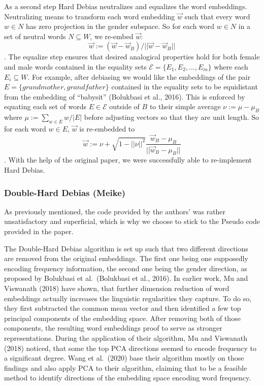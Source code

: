 \documentclass[
  english,
  man,floatsintext]{apa6}
\begin{document}
As a second step Hard Debias neutralizes and equalizes the word embeddings. Neutralizing means to transform each word embedding \(\vec{w}\) such that every word \(w\in N\) has zero projection in the gender subspace. So for each word \(w\in N\) in a set of neutral words \(N \subseteq W\), we re-embed \(\vec{w}\): \[\vec{w}:=(\vec{w}-\vec{w}_B)/||\vec{w}-\vec{w}_B||\]. The equalize step ensures that desired analogical properties hold for both female and male words contained in the equality sets \(\mathcal{E}=\{E_1,E_2,...,E_m\}\) where each \(E_i \subseteq W\). For example, after debiasing we would like the embeddings of the pair \(E=\{grandmother, grandfather\}\) contained in the equality sets to be equidistant from the embedding of \enquote{babysit} (Bolukbasi et al., 2016). This is enforced by equating each set of words \(E\in \mathcal{E}\) outside of \(B\) to their simple average \(\nu:=\mu-\mu_B\) where \(\mu:=\sum_{w\in E}w/|E|\) before adjusting vectors so that they are unit length. So for each word \(w\in E\), \(\vec{w}\) is re-embedded to \[\vec{w}:=\nu+\sqrt{1-||\nu||^2}\frac{\vec{w}_B-\mu_B}{||\vec{w}_B-\mu_B||}\].
With the help of the original paper, we were successfully able to re-implement Hard Debias.

\hypertarget{double-hard-debias-meike}{%
\subsubsection{Double-Hard Debias (Meike)}\label{double-hard-debias-meike}}

As previously mentioned, the code provided by the authors' was rather unsatisfactory and superficial, which is why we choose to stick to the Pseudo code provided in the paper.

The Double-Hard Debias algorithm is set up such that two different directions are removed from the original embeddings. The first one being one supposedly encoding frequency information, the second one being the gender direction, as proposed by Bolukbasi et al.~(Bolukbasi et al., 2016).
In earlier work, Mu and Viswanath (2018) have shown, that further dimension reduction of word embeddings actually increases the linguistic regularities they capture. To do so, they first subtracted the common mean vector and then identified a few top principal components of the embedding space. After removing both of those components, the resulting word embeddings proof to serve as stronger representations. During the application of their algorithm, Mu and Viswanath (2018) noticed, that some the top PCA directions seemed to encode frequency to a significant degree.
Wang et al.~(2020) base their algorithm mostly on those findings and also apply PCA to their algorithm, claiming that to be a feasible method to identify directions of the embedding space encoding word frequency.
\end{document}
